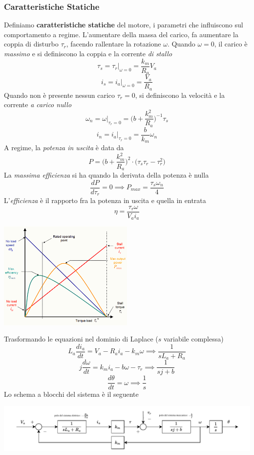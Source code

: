 \documentclass[10pt, letterpaper]{report}
\begin{document}
\subsubsection{Caratteristiche Statiche}
Definiamo \textbf{caratteristiche statiche} del motore, i parametri che influiscono sul comportamento a regime. L'aumentare della massa del carico, fa aumentare la coppia di disturbo $\tau_r$, facendo rallentare la rotazione $\omega$. Quando $\omega = 0$, il carico è \textit{massimo} e si definiscono la coppia e la corrente \textit{di stallo }
$$ \tau_s=\tau_r\Big|_{\omega = 0}= \frac{k_m}{R_a}V_a$$
$$ i_s=i_a\Big|_{\omega = 0}= \frac{V_a}{R_a}$$
Quando non è presente nessun carico $\tau_r=0$, si definiscono la velocità e la corrente \textit{a carico nullo} 
$$ \omega_n=\omega\Big|_{\tau_r = 0}=\Big(b+\frac{k_m^2}{R_a}\Big)^{-1}\tau_s$$
$$ i_n=i_a|_{\tau_r = 0}=\frac{b}{k_m}\omega_n$$
A regime, la \textit{potenza in uscita} è data da 
$$ P=\Big( b+\frac{k_m^2}{R_a}  \Big)^2\cdot 
\Big( \tau_s\tau_r-\tau_r^2  \Big)$$
La \textit{massima efficienza} si ha quando la derivata della potenza è nulla 
$$ \frac{dP}{d\tau_r}=0\implies P_{max}=\frac{\tau_s\omega_n}{4}$$
L'\textit{efficienza} è il rapporto fra la potenza in uscita e quella in entrata 
$$ \eta =\frac{\tau_r\omega}{V_ai_a}$$
\begin{center}
    \includegraphics[width=0.5\textwidth ]{images/caratteristichStatiche.png}
\end{center}
Trasformando le equazioni nel dominio di Laplace ($s$ variabile complessa)
$$ L_a\frac{di_a}{dt}=V_a-R_ai_a-k_m\omega\implies \frac{1}{sL_a+R_a}$$
$$ j\frac{d\omega}{dt}=k_mi_a-b\omega-\tau_r\implies \frac{1}{sj+b}$$
$$ \dfrac{d\theta}{dt}=\omega \implies\frac{1}{s}$$
Lo schema a blocchi del sistema è il seguente
\begin{center}
    \includegraphics[width=1\textwidth ]{images/schemaBlocchiMotoreDc.pdf}
\end{center}
\end{document}
